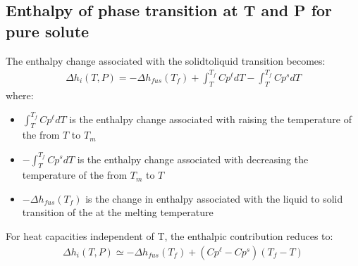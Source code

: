 \documentclass[letterpaper,10pt,english]{jupyterBook}
\begin{document}
\subsection{Enthalpy of phase transition at T and P for pure solute}
\label{\detokenize{Solubility:enthalpy-of-phase-transition-at-t-and-p-for-pure-solute}}
\sphinxAtStartPar
The enthalpy change associated with the solid\sphinxhyphen{}to\sphinxhyphen{}liquid transition becomes:
\begin{equation*}
\begin{split}
\Delta{h}_i(T,P)=-\Delta{h_{fus}\left(T_f\right)}+\int_T^{T_f}Cp^{\ell}dT-\int_T^{T_f}Cp^{s}dT
\end{split}
\end{equation*}
\sphinxAtStartPar
where:
\begin{itemize}
\item {} 
\sphinxAtStartPar
\(\int_T^{T_f}Cp^{\ell}dT\) is the enthalpy change associated with raising the temperature of the  from \(T\) to \(T_m\)

\item {} 
\sphinxAtStartPar
\(-\int_T^{T_f}Cp^{s}dT\) is the enthalpy change associated with decreasing the temperature of the  from \(T_m\) to \(T\)

\item {} 
\sphinxAtStartPar
\({-\Delta{h_{fus}\left(T_f\right)}}\) is the change in enthalpy associated with the liquid to solid transition of the  at the melting temperature

\end{itemize}

\sphinxAtStartPar
For heat capacities independent of T, the enthalpic contribution reduces to:
\begin{equation*}
\begin{split}
\Delta{h}_i(T,P)\simeq-\Delta{h_{fus}\left(T_f\right)}+\left(Cp^{\ell}-Cp^{s}\right)\left(T_f-T\right)
\end{split}
\end{equation*}
\end{document}
